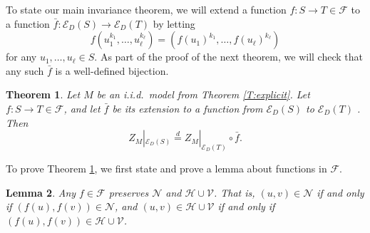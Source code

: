 \documentclass[aop, preprint]{imsart}
\theoremstyle{plain}
\newtheorem{theorem}{Theorem}[section]
\newtheorem{lemma}[theorem]{Lemma}
\theoremstyle{definition}
\theoremstyle{plain}
\newcommand{\scrE}{\mathcal{E}}
\newcommand{\scrV}{\mathcal{V}}
\newcommand{\scrH}{\mathcal{H}}
\newcommand{\scrN}{\mathcal{N}}
\newcommand{\scrF}{\mathcal{F}}
\newcommand{\eqd}{\stackrel{d}{=}}
\begin{document}
To state our main invariance theorem, we will extend a function $f:S \to T \in \scrF$ to a function $\bar f:\scrE_D(S) \to \scrE_D(T)$ by letting 
$$
f(u_1^{k_1}, \dots, u_\ell^{k_\ell}) = (f(u_1)^{k_1}, \dots, f(u_\ell)^{k_\ell})
$$
for any $u_1, \dots, u_\ell \in S$. As part of the proof of the next theorem, we will check that any such $\bar f$ is a well-defined bijection.

\begin{theorem}
	\label{T:iid-trans}
Let $M$ be an i.i.d.\ model from Theorem \ref{T:explicit}. Let $f:S \to T \in \scrF$, and let $\bar f$ be its extension to a function from $\scrE_D(S)$ to $\scrE_D(T)$ . Then
	$$
	Z_M|_{\scrE_D(S)} \eqd Z_M|_{\scrE_D(T)} \circ \bar f.
	$$
\end{theorem}

To prove Theorem \ref{T:iid-trans}, we first state and prove a lemma about functions in $\scrF$.

\begin{lemma}
	\label{L:N-preservation}
	Any $f \in \scrF$ preserves $\scrN$ and $\scrH \cup \scrV$. That is, $(u, v) \in \scrN$ if and only if $(f(u), f(v)) \in \scrN$, and $(u, v) \in \scrH \cup \scrV$ if and only if $(f(u), f(v)) \in \scrH \cup \scrV$.
\end{lemma}
\end{document}
